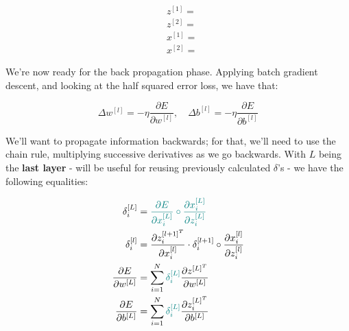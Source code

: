 \documentclass[12pt]{article}
\begin{document}
\begin{enumerate}[leftmargin=\labelsep]
        \begin{equation*}
          \begin{aligned}
             & z^{[1]} =  \\
             & z^{[2]} =  \\
             & x^{[1]} =  \\
             & x^{[2]} = 
          \end{aligned}
        \end{equation*}

        We're now ready for the back propagation phase. Applying batch gradient descent,
        and looking at the half squared error loss, we have that:

        \begin{equation*}
          \Delta w^{[l]} = - \eta \frac{\partial E}{\partial w^{[l]}}, \quad
          \Delta b^{[l]} = - \eta \frac{\partial E}{\partial b^{[l]}}
        \end{equation*}

        We'll want to propagate information backwards; for that, we'll need to use
        the chain rule, multiplying successive derivatives as we go backwards.
        With $L$ being the \textbf{last layer} - will be useful for reusing previously
        calculated $\delta$'s - we have the following equalities:

        \begin{align*}
          \delta_i^{[L]}                      & = \textcolor{teal}{\frac{\partial E}{\partial x_i^{[L]}} \circ
          \frac{\partial x_i^{[L]}}{\partial z_i^{[L]}}}                                                                                   \\
          \delta_i^{[l]}                      & =
          \frac{\partial z_i^{[l + 1]^T}}{\partial x_i^{[l]}} \cdot \delta_i^{[l + 1]} \circ \frac{\partial x_i^{[l]}}{\partial z_i^{[l]}} \\
          \frac{\partial E}{\partial w^{[L]}} & = \sum_{i=1}^N \textcolor{teal}{\delta_i^{[L]}}
          \frac{\partial z^{[L]^T}}{\partial w^{[L]}}                                                                                      \\
          \frac{\partial E}{\partial b^{[L]}} & = \sum_{i=1}^N \textcolor{teal}{\delta_i^{[L]}}
          \frac{\partial z_i^{[L]^T}}{\partial b^{[L]}}
        \end{align*}


\end{enumerate}
\end{document}
